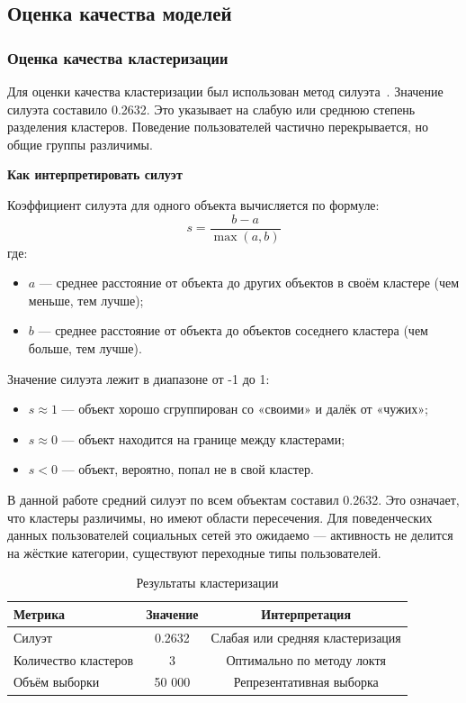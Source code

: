 \documentclass[14pt, a4paper]{extarticle}
\begin{document}
\newpage
\subsection{Оценка качества моделей}

\subsubsection{Оценка качества кластеризации}

Для оценки качества кластеризации был использован метод силуэта~\cite{chubukova2024}. Значение силуэта составило 0.2632.
Это указывает на слабую или среднюю степень разделения кластеров. Поведение пользователей частично перекрывается, но общие группы различимы.

\textbf{Как интерпретировать силуэт}

Коэффициент силуэта для одного объекта вычисляется по формуле:
\[
s = \frac{b - a}{\max(a, b)}
\]
где:
\begin{itemize}
    \item $a$ — среднее расстояние от объекта до других объектов в своём кластере (чем меньше, тем лучше);
    \item $b$ — среднее расстояние от объекта до объектов соседнего кластера (чем больше, тем лучше).
\end{itemize}

Значение силуэта лежит в диапазоне от -1 до 1:
\begin{itemize}
    \item $s \approx 1$ — объект хорошо сгруппирован со «своими» и далёк от «чужих»;
    \item $s \approx 0$ — объект находится на границе между кластерами;
    \item $s < 0$ — объект, вероятно, попал не в свой кластер.
\end{itemize}

В данной работе средний силуэт по всем объектам составил 0.2632. Это означает, что кластеры различимы, но имеют области пересечения. Для поведенческих данных пользователей социальных сетей это ожидаемо — активность не делится на жёсткие категории, существуют переходные типы пользователей.

\begin{table}[h!]
\centering
\caption{Результаты кластеризации}
\begin{tabular}{|l|c|c|}
\hline
\textbf{Метрика} & \textbf{Значение} & \textbf{Интерпретация} \\
\hline
Силуэт & 0.2632 & Слабая или средняя кластеризация \\
Количество кластеров & 3 & Оптимально по методу локтя \\
Объём выборки & 50 000 & Репрезентативная выборка \\
\hline
\end{tabular}
\end{table}
\end{document}
